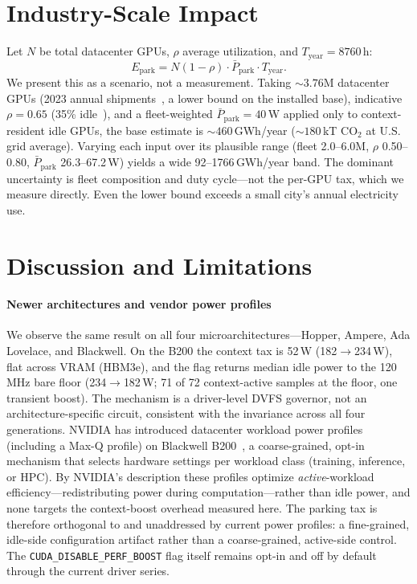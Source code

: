 \documentclass[conference]{IEEEtran}
\newcommand{\perfboost}{\texttt{\mbox{CUDA}\_\hspace{0pt}\mbox{DISABLE}\_\hspace{0pt}\mbox{PERF}\_\hspace{0pt}\mbox{BOOST}}\xspace}
\begin{document}
\section{Industry-Scale Impact}
Let $N$ be total datacenter GPUs, $\rho$ average utilization, and $T_{\text{year}}=8760$\,h:
\begin{equation}
E_{\text{park}} = N(1-\rho)\cdot \bar{P}_{\text{park}} \cdot T_{\text{year}}.
\label{eq:industry}
\end{equation}
We present this as a scenario, not a measurement. Taking ${\sim}3.76$M datacenter GPUs (2023 annual shipments~\cite{nvidia-shipments}, a lower bound on the installed base), indicative $\rho = 0.65$ (35\% idle~\cite{flexera}), and a fleet-weighted $\bar{P}_{\text{park}} = 40$\,W applied only to context-resident idle GPUs, the base estimate is ${\sim}460$\,GWh/year (${\sim}180$\,kT CO$_2$ at U.S. grid average). Varying each input over its plausible range (fleet 2.0--6.0M, $\rho$ 0.50--0.80, $\bar{P}_{\text{park}}$ 26.3--67.2\,W) yields a wide 92--\num{1766}\,GWh/year band. The dominant uncertainty is fleet composition and duty cycle---not the per-GPU tax, which we measure directly. Even the lower bound exceeds a small city's annual electricity use.

\section{Discussion and Limitations}
\paragraph{Newer architectures and vendor power profiles}
We observe the same result on all four microarchitectures---Hopper, Ampere, Ada Lovelace, and Blackwell. On the B200 the context tax is 52\,W (182$\to$234\,W), flat across VRAM (HBM3e), and the flag returns median idle power to the 120\,MHz bare floor (234$\to$182\,W; 71 of 72 context-active samples at the floor, one transient boost). The mechanism is a driver-level DVFS governor, not an architecture-specific circuit, consistent with the invariance across all four generations. NVIDIA has introduced datacenter workload power profiles (including a Max-Q profile) on Blackwell B200~\cite{nvidia-power-profiles}, a coarse-grained, opt-in mechanism that selects hardware settings per workload class (training, inference, or HPC). By NVIDIA's description these profiles optimize \emph{active}-workload efficiency---redistributing power during computation---rather than idle power, and none targets the context-boost overhead measured here. The parking tax is therefore orthogonal to and unaddressed by current power profiles: a fine-grained, idle-side configuration artifact rather than a coarse-grained, active-side control. The \perfboost flag itself remains opt-in and off by default through the current driver series.
\end{document}
